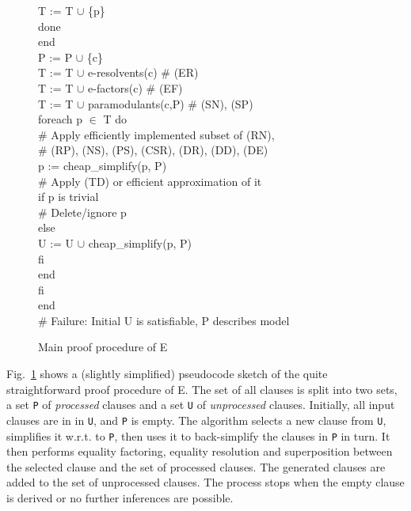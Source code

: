 \documentclass{article}
\begin{document}
\begin{figure}[hp]
\begin{center}
\begin{tabbing}
              T := T $\cup$ \{p\}\-\\
            done\-\\
          end\\
          P := P $\cup$ \{c\}\\
          T := T $\cup$ e-resolvents(c)    \# (ER)\\
          T := T $\cup$ e-factors(c)       \# (EF)\\
          T := T $\cup$ paramodulants(c,P) \# (SN), (SP)\\
          foreach p $\in$ T do\+\\
            \# Apply efficiently implemented subset of (RN),\\
            \# (RP), (NS), (PS), (CSR), (DR), (DD), (DE)\\
            p := cheap\_simplify(p, P)\\
            \# Apply (TD) or efficient approximation of it\\
            if p is trivial\+\\
              \# Delete/ignore p\-\\
            else\+\\
               U := U $\cup$ cheap\_simplify(p, P)\-\\
            fi\-\\
          end\-\\
        fi\-\\        
      end\\
      \# Failure: Initial U is satisfiable, P describes model
    \end{tabbing}
    \normalfont
    \caption{Main proof procedure of E}
    \label{fig:procedure}
  \end{center}
\end{figure}

Fig.~\ref{fig:procedure} shows a (slightly simplified) pseudocode
sketch of the quite straightforward proof procedure of E. The set of
all clauses is split into two sets, a set \texttt{P} of
\emph{processed} clauses and a set \texttt{U} of \emph{unprocessed}
clauses. Initially, all input clauses are in in \texttt{U}, and
\texttt{P} is empty. The algorithm selects a new clause from
\texttt{U}, simplifies it w.r.t. to \texttt{P}, then uses it to
back-simplify the clauses in \texttt{P} in turn. It then performs
equality factoring, equality resolution and superposition between the
selected clause and the set of processed clauses. The generated
clauses are added to the set of unprocessed clauses. The process stops
when the empty clause is derived or no further inferences are
possible.
\end{document}
